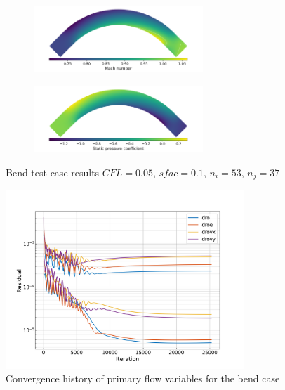 \documentclass{article}
\begin{document}
\begin{figure}[H]
    \centering
    \begin{subfigure}{0.99\textwidth}
        \centering
        \includegraphics[width=0.7\textwidth]{figures/bend_mach.png}
        \caption{}
        \label{fig:bend_mach}
    \end{subfigure}
    \begin{subfigure}{0.99\textwidth}
        \centering
        \includegraphics[width=0.7\textwidth]{figures/bend_cp.png}
        \caption{}
        \label{fig:bend_cp}
    \end{subfigure}
    \caption{Bend test case results $CFL = 0.05$, $sfac = 0.1$, $n_i = 53$, $n_j = 37$}
\end{figure}

\begin{figure}[H]
    \centering
    \includegraphics[width=0.8\textwidth]{figures/bend_conv.png}
    \caption{Convergence history of primary flow variables for the bend case}
    \label{fig:bend_conv}
\end{figure}
\end{document}
